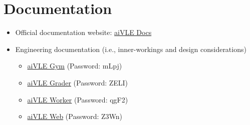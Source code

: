 \section{Documentation}
\label{as:links-documentation}
\begin{itemize}
    \item Official documentation website: \href{https://edu-ai.github.io/aivle-docs/}{aiVLE Docs}
    \item Engineering documentation (i.e., inner-workings and design considerations)
    \begin{itemize}
        \item \href{https://yuanhong.larksuite.com/docs/docusSYdnLXZBojin39b8DGzKMT}{aiVLE Gym} (Password: mLpj)
        \item \href{https://yuanhong.larksuite.com/docs/docuseeHRJWAMV3p3uL7yYCOeYx}{aiVLE Grader} (Password: ZELI)
        \item \href{https://yuanhong.larksuite.com/docs/docussD8ik4yBXShA5kPyRGhgdg}{aiVLE Worker} (Password: qgF2)
        \item \href{https://yuanhong.larksuite.com/docs/docusfWZk1oYG8qkEMG7y2oxkye}{aiVLE Web} (Password: Z3Wn)
    \end{itemize}
\end{itemize}